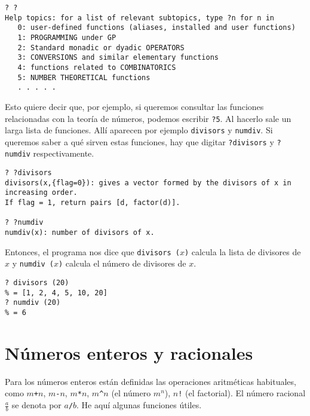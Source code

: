 \begin{framed}\footnotesize
\begin{verbatim}
? ?
Help topics: for a list of relevant subtopics, type ?n for n in
   0: user-defined functions (aliases, installed and user functions)
   1: PROGRAMMING under GP
   2: Standard monadic or dyadic OPERATORS
   3: CONVERSIONS and similar elementary functions
   4: functions related to COMBINATORICS
   5: NUMBER THEORETICAL functions
   . . . . .
\end{verbatim}
\end{framed}

Esto quiere decir que, por ejemplo, si queremos consultar las funciones
relacionadas con la teoría de números, podemos escribir \texttt{?5}. Al hacerlo
sale un larga lista de funciones. Allí aparecen por ejemplo \texttt{divisors} y
\texttt{numdiv}. Si queremos saber a qué sirven estas funciones, hay que digitar
\texttt{?divisors} y \texttt{?numdiv} respectivamente.

\begin{framed}\footnotesize
\begin{verbatim}
? ?divisors
divisors(x,{flag=0}): gives a vector formed by the divisors of x in increasing order.
If flag = 1, return pairs [d, factor(d)].

? ?numdiv
numdiv(x): number of divisors of x.
\end{verbatim}
\end{framed}

Entonces, el programa nos dice que \texttt{divisors\,($x$)} calcula la lista de
divisores de $x$ y \texttt{numdiv\,($x$)} calcula el número de divisores de $x$.

\begin{framed}\footnotesize
\begin{verbatim}
? divisors (20)
% = [1, 2, 4, 5, 10, 20]
? numdiv (20)
% = 6
\end{verbatim}
\end{framed}


\section{Números enteros y racionales}

Para los números enteros están definidas las operaciones aritméticas habituales,
como \texttt{$m$+$n$}, \texttt{$m$-$n$}, \texttt{$m$*$n$}, \texttt{$m$\^{}$n$}
(el número $m^n$), \texttt{$n$!} (el factorial). El número racional
$\frac{a}{b}$ se denota por \texttt{$a$/$b$}. He aquí algunas funciones útiles.


